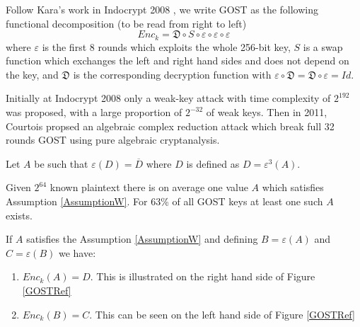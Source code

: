 \begin{table}[!h]
	\centering
	\caption[Key Schedule in GOST]{Key schedule in GOST}
	\label{tab:GOSTKey}
	\addtolength{\tabcolsep}{-6pt}
\end{table}

Follow Kara's work in Indocrypt 2008 \cite{GOSTReflectionKara}, we write GOST as the following functional decomposition (to be read from right to left)
$$Enc_{k}=\mathfrak{D}  \circ S \circ \varepsilon \circ \varepsilon \circ \varepsilon$$
where $\varepsilon$ is the first 8 rounds which exploits the whole 256-bit key, $S$ is a swap function which exchanges the left and right hand sides and does not depend on the key, and $\mathfrak{D}$ is the corresponding decryption function with $\varepsilon \circ \mathfrak{D}  = \mathfrak{D} \circ \varepsilon = Id$.

Initially at Indocrypt 2008 only a weak-key attack with time complexity of $2^{192}$ was proposed, with a large proportion of $2^{-32}$ of weak keys. Then in 2011, Courtois propsed an algebraic complex reduction attack which break full 32 rounds GOST using pure algebraic cryptanalysis. 

\begin{myAssumption} \label{AssumptionW}
	\cite{gostreport} Let $A$ be such that $\varepsilon(D) = \overline{D}$ where $D$ is defined as $D=\varepsilon^{3}(A)$.
\end{myAssumption}

\begin{fact}
	\cite{gostreport} Given $2^{64}$ known plaintext there is on average one value $A$ which satisfies Assumption \ref{AssumptionW}. For 63\% of all GOST keys at least one such $A$ exists.
\end{fact}

\begin{fact} 
\cite{gostreport} If $A$ satisfies the Assumption \ref{AssumptionW} and defining $B = \varepsilon(A) $ and $C = \varepsilon(B)$ we have:
\begin{enumerate}
	\item $Enc_k(A) = D$. This is illustrated on the right hand side of Figure \ref{GOSTRef}
	\item $Enc_k(B) = C$. This can be seen on the left hand side of Figure \ref{GOSTRef}
\end{enumerate}
\end{fact}

